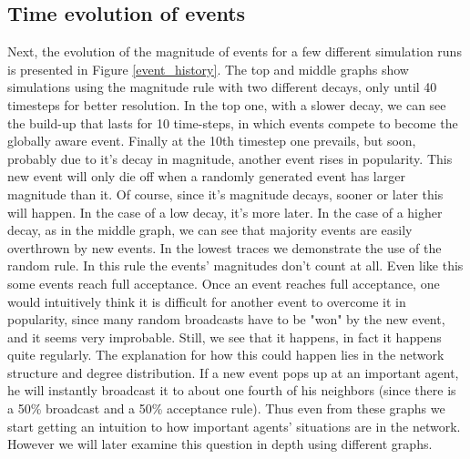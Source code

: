 \documentclass [12pt,a4paper,twoside]{article}
\begin{document}
\subsection{Time evolution of events}
Next, the evolution of the magnitude of events for a few different simulation runs is presented in Figure \ref{event_history}. The top and middle graphs show simulations using the magnitude rule with two different decays, only until 40 timesteps for better resolution. In the top one, with a slower decay, we can see the build-up that lasts for 10 time-steps, in which events compete to become the globally aware event. Finally at the 10th timestep one prevails, but soon, probably due to it's decay in magnitude, another event rises in popularity. This new event will only die off when a randomly generated event has larger magnitude than it. Of course, since it's magnitude decays, sooner or later this will happen. In the case of a low decay, it's more later. In the case of a higher decay, as in the middle graph, we can see that majority events are easily overthrown by new events. In the lowest traces we demonstrate the use of the random rule. In this rule the events' magnitudes don't count at all. Even like this some events reach full acceptance. Once an event reaches full acceptance, one would intuitively think it is difficult for another event to overcome it in popularity, since many random broadcasts have to be "won" by the new event, and it seems very improbable. Still, we see that it happens, in fact it happens quite regularly. The explanation for how this could happen lies in the network structure and degree distribution. If a new event pops up at an important agent, he will instantly broadcast it to about one fourth of his neighbors (since there is a 50\% broadcast and a 50\% acceptance rule). Thus even from these graphs we start getting an intuition to how important agents' situations are in the network. However we will later examine this question in depth using different graphs.
\end{document}
